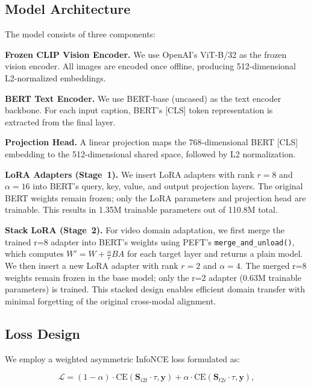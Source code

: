 \documentclass[10pt,leqno]{amsart}
\begin{document}
\subsection{Model Architecture}

The model consists of three components:

\textbf{Frozen CLIP Vision Encoder.} We use OpenAI's ViT-B/32 as the frozen vision encoder. All images are encoded once offline, producing 512-dimensional L2-normalized embeddings.

\textbf{BERT Text Encoder.} We use BERT-base (uncased) as the text encoder backbone. For each input caption, BERT's [CLS] token representation is extracted from the final layer.

\textbf{Projection Head.} A linear projection maps the 768-dimensional BERT [CLS] embedding to the 512-dimensional shared space, followed by L2 normalization.

\textbf{LoRA Adapters (Stage~1).} We insert LoRA \citep{hu2022lora} adapters with rank $r=8$ and $\alpha=16$ into BERT's query, key, value, and output projection layers. The original BERT weights remain frozen; only the LoRA parameters and projection head are trainable. This results in 1.35M trainable parameters out of 110.8M total.

\textbf{Stack LoRA (Stage~2).} For video domain adaptation, we first merge the trained r=8 adapter into BERT's weights using PEFT's \texttt{merge\_and\_unload()}, which computes $W' = W + \frac{\alpha}{r}BA$ for each target layer and returns a plain model. We then insert a new LoRA adapter with rank $r=2$ and $\alpha=4$. The merged r=8 weights remain frozen in the base model; only the r=2 adapter (0.63M trainable parameters) is trained. This stacked design enables efficient domain transfer with minimal forgetting of the original cross-modal alignment.

\subsection{Loss Design}

We employ a weighted asymmetric InfoNCE loss \citep{oord2018representation} formulated as:

\begin{equation}
\mathcal{L} = (1 - \alpha) \cdot \text{CE}(\mathbf{S}_{i2t} \cdot \tau, \mathbf{y}) + \alpha \cdot \text{CE}(\mathbf{S}_{t2i} \cdot \tau, \mathbf{y}),
\label{eq:asymmetric_loss}
\end{equation}
\end{document}
